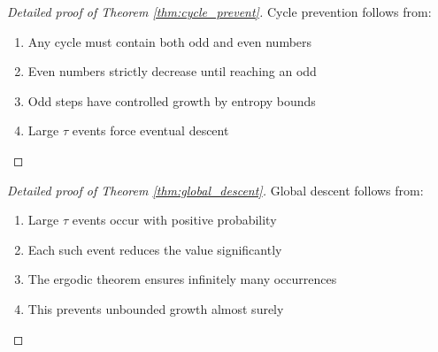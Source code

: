 \begin{proof}[Detailed proof of Theorem \ref{thm:cycle_prevent}]
Cycle prevention follows from:
\begin{enumerate}
\item Any cycle must contain both odd and even numbers
\item Even numbers strictly decrease until reaching an odd
\item Odd steps have controlled growth by entropy bounds
\item Large $\tau$ events force eventual descent
\end{enumerate}
\end{proof}

\begin{proof}[Detailed proof of Theorem \ref{thm:global_descent}]
Global descent follows from:
\begin{enumerate}
\item Large $\tau$ events occur with positive probability
\item Each such event reduces the value significantly
\item The ergodic theorem ensures infinitely many occurrences
\item This prevents unbounded growth almost surely
\end{enumerate}
\end{proof} 